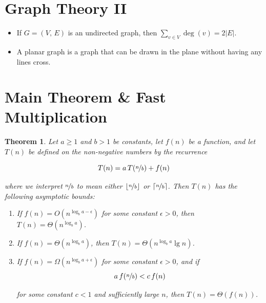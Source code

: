 \documentclass[12pt]{scrartcl}
\newcommand{\bigO}[1]{O(#1)}
\newcommand{\bigTheta}[1]{\Theta(#1)}
\newcommand{\bigOmega}[1]{\Omega(#1)}
\newcommand{\ceil}[1]{\lceil #1 \rceil}
\newcommand{\floor}[1]{\lfloor #1 \rfloor}
\newtheorem{theorem}{Theorem}
\begin{document}
\section{Graph Theory II}
\begin{itemize}
    \item If $G = (V,\, E)$ is an undirected graph, then $\sum _{v \in V} \deg(v) = 2|E|$.
    \item A planar graph is a graph that can be drawn in the plane without having any lines cross.
\end{itemize}


\section{Main Theorem \& Fast Multiplication}
\begin{theorem}
Let $a \geq 1$ and $b > 1$ be constants, let $f(n)$ be a function, and let $T(n)$ be defined on the non-negative numbers by the recurrence

\begin{equation}\label{eq:recurrence}
    T(n) = a\, T(\nicefrac{n}{b}) + f(n)
\end{equation}

\noindent where we interpret $\nicefrac{n}{b}$ to mean either $\floor{\nicefrac{n}{b}}$ or $\ceil{\nicefrac{n}{b}}$. Then $T(n)$ has the following asymptotic bounds:

\begin{enumerate}
    \item If $f(n) = \bigO{n^{\log_b a - \epsilon}} $ for some constant $\epsilon > 0$, then $T(n) = \bigTheta{n^{\log _b a}}$.
    \item If $f(n) = \bigTheta{n^{\log_b a}} $, then $T(n) = \bigTheta{n^{\log _b a} \lg n}$.
    \item If $f(n) = \bigOmega{n^{\log_b a + \epsilon}} $ for some constant $\epsilon > 0$, and if
        \begin{equation*}
            a\, f(\nicefrac{n}{b}) < c\, f(n)
        \end{equation*}

    for some constant $c < 1$ and sufficiently large $n$, then $T(n) = \bigTheta{f(n)}$.
\end{enumerate}
\end{theorem}
\end{document}
